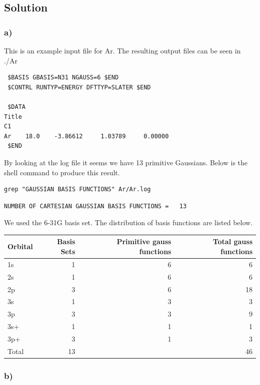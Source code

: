 \documentclass[11pt]{article}
\begin{document}
\subsection{Solution}
\label{sec-1-1}

\subsubsection{a)}
\label{sec-1-1-1}

This is an example input file for Ar. The resulting output files can be seen in ./Ar

\begin{verbatim}
 $BASIS GBASIS=N31 NGAUSS=6 $END
 $CONTRL RUNTYP=ENERGY DFTTYP=SLATER $END

 $DATA 
Title
C1
Ar    18.0    -3.86612     1.03789     0.00000
 $END
\end{verbatim}

By looking at the log file it seems we have 13 primitive Gaussians. Below is the shell command to produce this result.

\begin{verbatim}
grep "GAUSSIAN BASIS FUNCTIONS" Ar/Ar.log
\end{verbatim}

\begin{verbatim}
NUMBER OF CARTESIAN GAUSSIAN BASIS FUNCTIONS =   13
\end{verbatim}

We used the 6-31G basis set. The distribution of basis functions are listed below.

\begin{center}
\begin{tabular}{lrrr}
Orbital & Basis Sets & Primitive gauss functions & Total gauss functions\\
\hline
1s & 1 & 6 & 6\\
2s & 1 & 6 & 6\\
2p & 3 & 6 & 18\\
3s & 1 & 3 & 3\\
3p & 3 & 3 & 9\\
3s+ & 1 & 1 & 1\\
3p+ & 3 & 1 & 3\\
\hline
Total & 13 &  & 46\\
\end{tabular}
\end{center}



\subsubsection{b)}
\label{sec-1-1-2}
\end{document}
